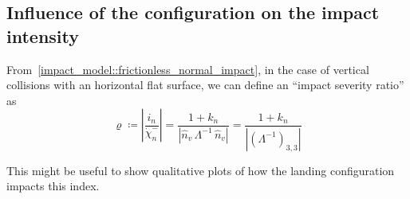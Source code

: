 \documentclass[letterpaper, 10 pt, conference]{ieeeconf}  %
\begin{document}
\subsection{Influence of the configuration on the impact intensity}
From~\eqref{impact_model::frictionless_normal_impact}, in the case of vertical collisions with an horizontal flat surface, we can define an \enquote{impact severity ratio} as
\begin{equation}\label{impact_model::impact_severity_ratio}
\varrho \coloneqq \left|\dfrac{i_n}{\dot{\chi}^{-}_n}\right| = \dfrac{1 + k_n}{\left|\hat{n}_v\,\Lambda^{-1}\,\hat{n}_v\right|} = \dfrac{1 + k_n}{\left|\left({\Lambda^{-1}}\right)_{3, 3}\right|}
\end{equation}

This might be useful to show qualitative plots of how the landing configuration impacts this index.\\

\clearpage
\end{document}
